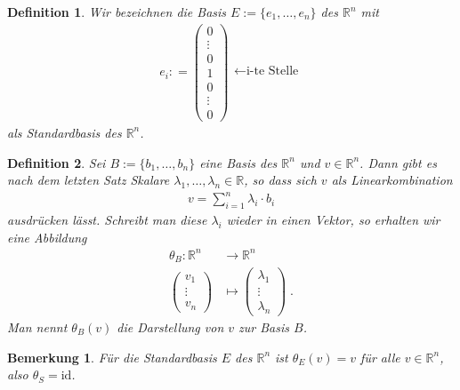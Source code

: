 \documentclass[]{article}
\newtheorem{Definition}{Definition}
\newtheorem{Bemerkung}{Bemerkung}
\begin{document}
\begin{Definition}
Wir bezeichnen die Basis $E:= \{ e_1, \hdots , e_n \}$ des $\mathbb{R}^n$ mit 
\begin{align*}
e_i : = \begin{pmatrix}
0 \\ \vdots \\ 0 \\ 1  \\ 0 \\ \vdots \\ 0
\end{pmatrix}
\begin{matrix}
 \\   \\  \leftarrow \text{i-te Stelle}  \\ \\  \\ 
\end{matrix}
\end{align*}
als Standardbasis des $\mathbb{R}^n$.
\end{Definition}

\begin{Definition}
Sei $B:= \{ b_1, \hdots , b_n \}$ eine Basis des $\mathbb{R}^n$ und $v \in \mathbb{R}^n$. Dann gibt es nach dem letzten Satz Skalare $\lambda_1, \hdots , \lambda_n \in \mathbb{R}$, so dass sich $v$ als Linearkombination 
\begin{align*}
v = \sum_{i=1}^n \lambda_i \cdot b_i 
\end{align*}
ausdrücken lässt. Schreibt man diese $\lambda_i$ wieder in einen Vektor, so erhalten wir eine Abbildung
\begin{align*}
\theta_B : \mathbb{R}^n & \to \mathbb{R}^n \\
\begin{pmatrix}
v_1 \\ \vdots \\ v_n
\end{pmatrix}
& \mapsto 
\begin{pmatrix}
\lambda_1 \\ \vdots \\ \lambda_n
\end{pmatrix} \; .
\end{align*}
Man nennt $\theta_B(v)$ die Darstellung von $v$ zur Basis $B$.
\end{Definition}

\begin{Bemerkung}
Für die Standardbasis $E$ des $\mathbb{R}^n$ ist $\theta_E(v) = v$ für alle $v \in \mathbb{R}^n$, also $\theta_S = \text{id}$.
\end{Bemerkung}
\end{document}
